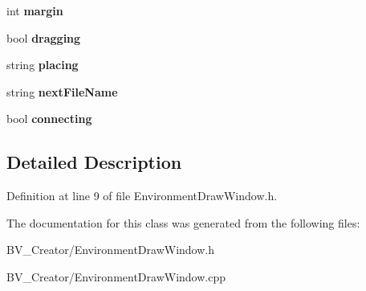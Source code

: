 \begin{DoxyCompactItemize}
\item 
\hypertarget{class_environment_draw_window_a5e1e864e0b7f6431630c576beed17e05}{
int {\bfseries margin}}
\label{class_environment_draw_window_a5e1e864e0b7f6431630c576beed17e05}

\item 
\hypertarget{class_environment_draw_window_a5d77ee07fb05b53f388648cb670357bc}{
bool {\bfseries dragging}}
\label{class_environment_draw_window_a5d77ee07fb05b53f388648cb670357bc}

\item 
\hypertarget{class_environment_draw_window_ae83da2bb35dc148f3560c2abb46b2f02}{
string {\bfseries placing}}
\label{class_environment_draw_window_ae83da2bb35dc148f3560c2abb46b2f02}

\item 
\hypertarget{class_environment_draw_window_a72981cacd507c87d5e6ba52da545135b}{
string {\bfseries nextFileName}}
\label{class_environment_draw_window_a72981cacd507c87d5e6ba52da545135b}

\item 
\hypertarget{class_environment_draw_window_a4d314332c42e568c5178adb0ef6d44ad}{
bool {\bfseries connecting}}
\label{class_environment_draw_window_a4d314332c42e568c5178adb0ef6d44ad}

\end{DoxyCompactItemize}


\subsection{Detailed Description}


Definition at line 9 of file EnvironmentDrawWindow.h.

The documentation for this class was generated from the following files:\begin{DoxyCompactItemize}
\item 
BV\_\-Creator/EnvironmentDrawWindow.h\item 
BV\_\-Creator/EnvironmentDrawWindow.cpp\end{DoxyCompactItemize}
